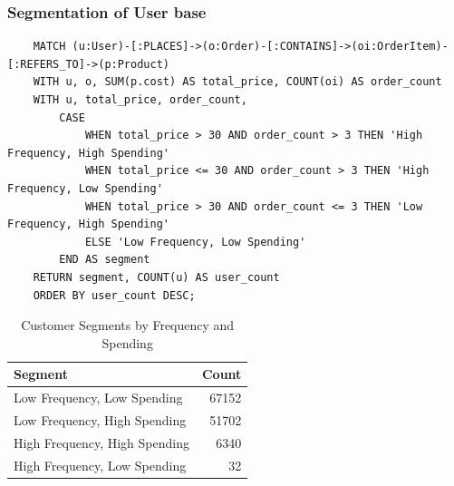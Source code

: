 \documentclass[a4paper,12pt]{article}
\begin{document}
  \subsubsection{Segmentation of User base}
  \begin{verbatim}
    MATCH (u:User)-[:PLACES]->(o:Order)-[:CONTAINS]->(oi:OrderItem)-[:REFERS_TO]->(p:Product)
    WITH u, o, SUM(p.cost) AS total_price, COUNT(oi) AS order_count
    WITH u, total_price, order_count,
        CASE 
            WHEN total_price > 30 AND order_count > 3 THEN 'High Frequency, High Spending'
            WHEN total_price <= 30 AND order_count > 3 THEN 'High Frequency, Low Spending'
            WHEN total_price > 30 AND order_count <= 3 THEN 'Low Frequency, High Spending'
            ELSE 'Low Frequency, Low Spending'
        END AS segment
    RETURN segment, COUNT(u) AS user_count
    ORDER BY user_count DESC;
  \end{verbatim}  

  \begin{table}[h!]
    \centering
    \caption{Customer Segments by Frequency and Spending}
    \label{tab:customer_segments}
    \begin{tabular}{l r}
        \toprule
        \textbf{Segment} & \textbf{Count} \\
        \midrule
        Low Frequency, Low Spending  & 67152 \\
        Low Frequency, High Spending & 51702 \\
        High Frequency, High Spending & 6340 \\
        High Frequency, Low Spending & 32 \\
        \bottomrule
    \end{tabular}
\end{table}
\end{document}
